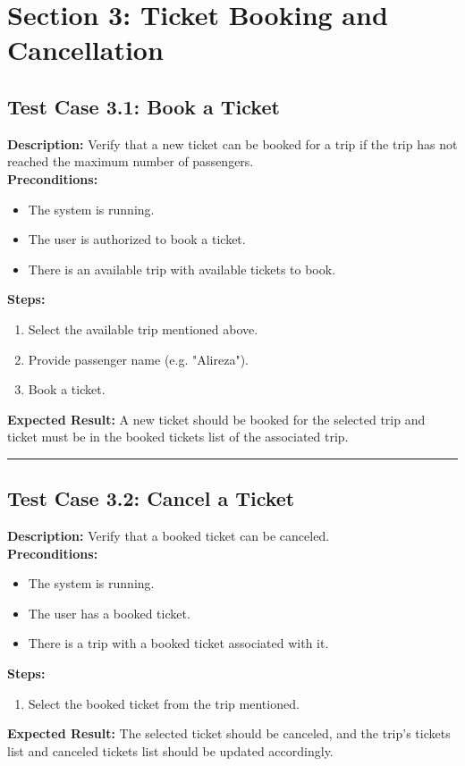 \documentclass{article}
\begin{document}
\pagebreak

\section{Section 3: Ticket Booking and Cancellation}
\bigskip
\bigskip
\subsection{Test Case 3.1: Book a Ticket}

\textbf{Description:} Verify that a new ticket can be booked for a trip if the trip has not reached the maximum number of passengers.\\
\textbf{Preconditions:}
\begin{itemize}
  \item The system is running.
  \item The user is authorized to book a ticket.
  \item There is an available trip with available tickets to book.
\end{itemize}
\textbf{Steps:}
\begin{enumerate}
  \item Select the available trip mentioned above.
  \item Provide passenger name (e.g. "Alireza").
  \item Book a ticket.
\end{enumerate}
\textbf{Expected Result:}  A new ticket should be booked for the selected trip and ticket must be in the booked tickets list of the associated trip.

\bigskip
\hrule
\bigskip

\subsection{Test Case 3.2: Cancel a Ticket}

\textbf{Description:} Verify that a booked ticket can be canceled.\\
\textbf{Preconditions:}
\begin{itemize}
  \item The system is running.
  \item The user has a booked ticket.
  \item There is a trip with a booked ticket associated with it.
\end{itemize}
\textbf{Steps:}
\begin{enumerate}
  \item Select the booked ticket from the trip mentioned.
\end{enumerate}
\textbf{Expected Result:} The selected ticket should be canceled, and the trip's tickets list and canceled tickets list should be updated accordingly.
\end{document}
